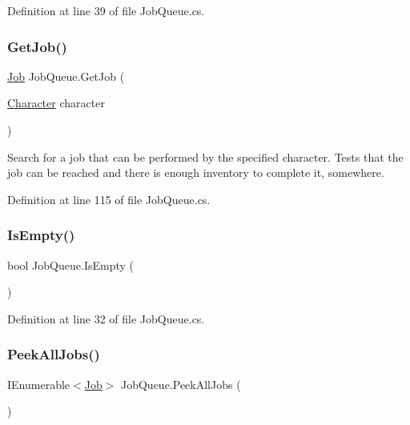 Definition at line 39 of file Job\+Queue.\+cs.

\mbox{\label{class_job_queue_a22dd1f2d2bfdffc2b9cf8540c547f12b}} 
\subsubsection{\texorpdfstring{Get\+Job()}{GetJob()}}
{\footnotesize\ttfamily \hyperlink{class_job}{Job} Job\+Queue.\+Get\+Job (\begin{DoxyParamCaption}\item[{\hyperlink{class_project_porcupine_1_1_entities_1_1_character}{Character}}]{character }\end{DoxyParamCaption})}



Search for a job that can be performed by the specified character. Tests that the job can be reached and there is enough inventory to complete it, somewhere. 



Definition at line 115 of file Job\+Queue.\+cs.

\mbox{\label{class_job_queue_ab88494452f5c6b0115d5fe5b452fa8eb}} 
\subsubsection{\texorpdfstring{Is\+Empty()}{IsEmpty()}}
{\footnotesize\ttfamily bool Job\+Queue.\+Is\+Empty (\begin{DoxyParamCaption}{ }\end{DoxyParamCaption})}



Definition at line 32 of file Job\+Queue.\+cs.

\mbox{\label{class_job_queue_a233a410811f3f747f0fb62b59650cf25}} 
\subsubsection{\texorpdfstring{Peek\+All\+Jobs()}{PeekAllJobs()}}
{\footnotesize\ttfamily I\+Enumerable$<$\hyperlink{class_job}{Job}$>$ Job\+Queue.\+Peek\+All\+Jobs (\begin{DoxyParamCaption}{ }\end{DoxyParamCaption})}



